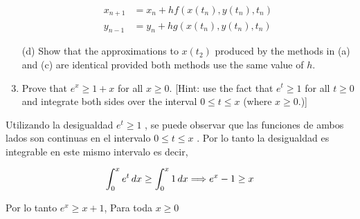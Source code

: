 \begin{enumerate}
 		 	\begin{align*}
 		 	x_{n+1} &= x_n + hf(x(t_n), y(t_n), t_n) \\
 		 	y_{n-1} &= y_n + hg(x(t_n), y(t_n), t_n)  
 		 	\end{align*}
 
 	 	\item[(d)] 
 	Show that the approximations to $x(t_2)$ produced by the methods
 	in (a) and (c) are identical provided both methods use the same
 	value of $h$.
 	\item
 	Prove that $e^x \geq 1 + x$ for all $x \geq 0$. [Hint: use the fact that $e^t \geq 1$
 	for all $t \geq 0$ and integrate both sides over the interval $0 \leq t \leq x$
 	(where $x \geq 0$.)]
 	\end{enumerate}
 	
	 	Utilizando la desigualdad $e^t \geq 1$ , se puede observar que las funciones de
	 	ambos lados son continuas en el intervalo $0 \leq t \leq x$ . Por lo tanto la desigualdad es integrable en este mismo intervalo es decir, 
 	
 	\[
 	\int_{0}^{x} e^{t} \, dx \geq \int_{0}^{x} 1 \, dx 
    \Longrightarrow e^x - 1 \geq x \\
 	\]
 	
 	Por lo tanto $e^x \geq x + 1$, Para toda $x\geq0$
 
 
